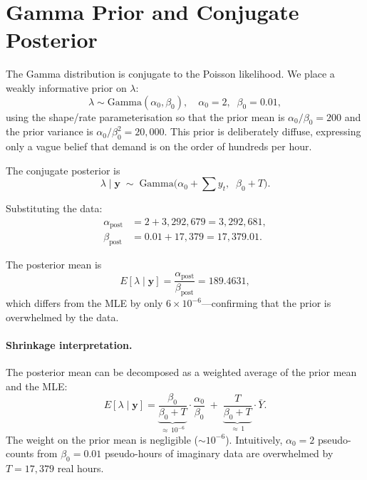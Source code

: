 \documentclass[12pt]{article}
\begin{document}
\section{Gamma Prior and Conjugate Posterior}
\label{sec:posterior}

The Gamma distribution is conjugate to the Poisson likelihood.  We
place a weakly informative prior on $\lambda$:
\begin{equation}
\lambda \sim \text{Gamma}(\alpha_0, \beta_0),
\quad \alpha_0 = 2,\;\; \beta_0 = 0.01,
\end{equation}
using the shape/rate parameterisation so that the prior mean is
$\alpha_0/\beta_0 = 200$ and the prior variance is
$\alpha_0/\beta_0^2 = 20{,}000$.  This prior is deliberately
diffuse, expressing only a vague belief that demand is on the order
of hundreds per hour.

The conjugate posterior is
\begin{equation}
\lambda \mid \mathbf{y} \;\sim\;
\text{Gamma}\!\bigl(\alpha_0 + \textstyle\sum y_t,\;\;
\beta_0 + T\bigr).
\label{eq:posterior}
\end{equation}

Substituting the data:
\begin{align}
\alpha_{\text{post}} &= 2 + 3{,}292{,}679 = 3{,}292{,}681, \\
\beta_{\text{post}} &= 0.01 + 17{,}379 = 17{,}379.01.
\end{align}

The posterior mean is
\begin{equation}
E[\lambda \mid \mathbf{y}]
= \frac{\alpha_{\text{post}}}{\beta_{\text{post}}}
= 189.4631,
\end{equation}
which differs from the MLE by only $6 \times 10^{-6}$---confirming
that the prior is overwhelmed by the data.

\paragraph{Shrinkage interpretation.}
The posterior mean can be decomposed as a weighted average of the
prior mean and the MLE:
\begin{equation}
E[\lambda \mid \mathbf{y}]
= \underbrace{\frac{\beta_0}{\beta_0 + T}}_{\approx\, 10^{-6}}
  \cdot \frac{\alpha_0}{\beta_0}
\;+\; \underbrace{\frac{T}{\beta_0 + T}}_{\approx\, 1}
  \cdot \bar{Y}.
\end{equation}
The weight on the prior mean is negligible (${\sim}10^{-6}$).
Intuitively, $\alpha_0 = 2$ pseudo-counts from $\beta_0 = 0.01$
pseudo-hours of imaginary data are overwhelmed by $T = 17{,}379$ real
hours.
\end{document}
